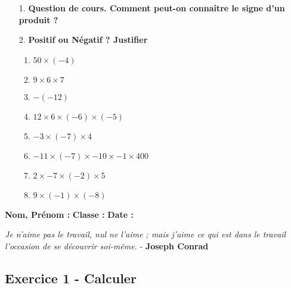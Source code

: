 \begin{enumerate}
    \item[1.] \textbf{Question de cours. Comment peut-on connaître le signe d'un produit ?} \\
    \Pointilles[3]

    \item[2.] \textbf{Positif ou Négatif ? Justifier} 
    \begin{enumerate}
        \item $50 \times (-4)$ \dotfill
        \item $9 \times 6 \times 7$ \dotfill
        \item $ -(-12)$ \dotfill
        \item $12 \times 6 \times (-6) \times (-5)$ \dotfill
        \item $-3 \times (-7) \times 4$ \dotfill
        \item $-11 \times (-7) \times -10 \times -1 \times 400$ \dotfill
        \item $2 \times -7 \times (-2) \times 5$ \dotfill
        \item $9 \times (-1) \times (-8)$ \dotfill
    \end{enumerate}
\end{enumerate}

\newpage

\textbf{Nom, Prénom :} \hspace{8cm} \textbf{Classe :} \hspace{3cm} \textbf{Date :}\\
\vspace{-0.8cm}
\begin{center}
  \textit{Je n'aime pas le travail, nul ne l'aime ; mais j'aime ce qui est dans le travail l'occasion de se découvrir soi-même.}  - \textbf{Joseph Conrad}
\end{center}
\vspace{-0.8cm}

\subsection*{Exercice 1 - Calculer}

